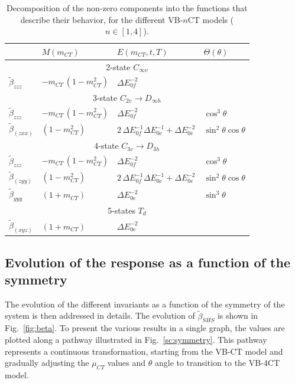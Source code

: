 \documentclass[USenglish]{article}
\begin{document}
\begin{table}
	
	\caption{Decomposition of the non-zero components into the functions that describe their behavior,  for the different VB-$n$CT models ($n\in[1,4]$).}
	\label{tab:dec}
	\begin{tabular}{llll}
		&$M(m_{CT})$ & $E(m_{CT}, t, T)$ & $\Theta(\theta)$ \\
		\midrule
		\multicolumn{4}{c}{2-state $C_{\infty v}$} \\
		\midrule
		$\tilde\beta_{zzz}$ & $-m_{CT}\,(1-m_{CT}^2)$ & $\Delta E_{0f}^{-2}$ & \\
		\midrule
		\multicolumn{4}{c}{3-state $C_{2v}\rightarrow D_{\infty h}$}\\
		\midrule
		$\tilde\beta_{zzz}$ & $-m_{CT}\,(1-m_{CT}^2)$ & $\Delta E_{0f}^{-2}$ & $\cos^3\theta$ \\
		$\tilde\beta_{(zxx)}$ & $(1-m_{CT}^2)$ & $2\,\Delta E_{0f}^{-1}\Delta E_{0e}^{-1}+\Delta E_{0e}^{-2}$ & $\sin^2\theta\cos\theta$\\
		\midrule
		\multicolumn{4}{c}{4-state $C_{3v}\rightarrow D_{3h}$} \\
		\midrule
		$\tilde\beta_{zzz}$ & $-m_{CT}\,(1-m_{CT}^2)$ & $\Delta E_{0f}^{-2}$ & $\cos^3\theta$\\
		$\tilde\beta_{(zyy)}$ & $(1-m_{CT}^2)$ & $2\,\Delta E_{0f}^{-1}\Delta E_{0e}^{-1}+\Delta E_{0e}^{-2}$ & $\sin^2\theta\cos\theta$\\
		$\tilde\beta_{yyy}$ & $ (1+m_{CT})$ & $\Delta E_{0e}^{-2}$ & $\sin^3\theta$\\
		\midrule
		\multicolumn{4}{c}{5-states $T_d$} \\
		\midrule
		$\tilde\beta_{(xyz)}$ & $ (1+m_{CT})$ & $\Delta E_{0e}^{-2}$ & \\
	\end{tabular}
\end{table}

\subsection{Evolution of the response as a function of the symmetry}

The evolution of the different invariants as a function of the symmetry of the system is then addressed in details.
The evolution of $\tilde\beta_{SHS}$ is shown in Fig.~\ref{fig:beta}. To present the various results in a single graph, the values are plotted along a pathway illustrated in Fig.~\ref{sc:symmetry}. This pathway represents a continuous transformation, starting from the VB-CT model and gradually adjusting the $\mu_{CT}$ values and $\theta$ angle to transition to the VB-4CT model.
\end{document}
